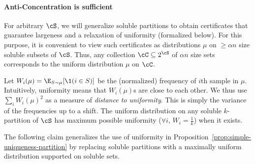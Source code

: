\paragraph{Anti-Concentration is sufficient} For arbitrary $\cS$, we will generalize soluble partitions to obtain certificates that  guarantee largeness and a relaxation of uniformity (formalized below). For this purpose, it is convenient to view such certificates as distributions $\mu$ on $\geq \alpha n$ size soluble subsets of $\cS$. Thus, any collection $\cC\subseteq 2^{\cS}$ of $\alpha n$ size sets corresponds to the uniform distribution $\mu$ on  $\cC$. 

Let $W_i(\mu) = \E_{S \sim \mu} [ \1(i \in S)]$ be the (normalized) frequency of $i$th sample in $\mu$. 
Intuitively, uniformity means that $W_i(\mu)$s are close to each other. We thus use $\sum_i W_i(\mu)^2$ as a measure of \emph{distance to uniformity}. This is simply the variance of the frequencies up to a shift. The uniform distribution on any soluble $k$-partition of $\cS$ has maximum possible uniformity ($\forall i$, $W_i = \frac{1}{k}$) when it exists.  


 
The following claim generalizes the use of uniformity in Proposition~\ref{prop:simple-uniqueness-partition} by replacing soluble partitions with a maximally uniform distribution supported on soluble sets.

